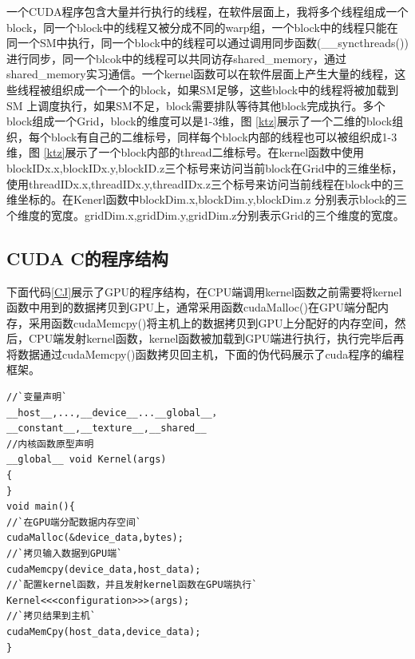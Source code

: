 一个CUDA程序包含大量并行执行的线程，在软件层面上，我将多个线程组成一个block，同一个block中的线程又被分成不同的warp组，一个block中的线程只能在同一个SM中执行，同一个block中的线程可以通过调用同步函数(\_\_syncthreads())进行同步，同一个blcok中的线程可以共同访存shared\_memory，通过shared\_memory实习通信。一个kernel函数可以在软件层面上产生大量的线程，这些线程被组织成一个一个的block，如果SM足够，这些block中的线程将被加载到SM 上调度执行，如果SM不足，block需要排队等待其他block完成执行。多个block组成一个Grid，block的维度可以是1-3维，图 \ref{ktz}展示了一个二维的block组织，每个block有自己的二维标号，同样每个block内部的线程也可以被组织成1-3维，图 \ref{ktz}展示了一个block内部的thread二维标号。在kernel函数中使用blockIDx.x,blockIDx.y,blockID.z三个标号来访问当前block在Grid中的三维坐标，使用threadIDx.x,threadIDx.y,threadIDx.z三个标号来访问当前线程在block中的三维坐标的。在Kenerl函数中blockDim.x,blockDim.y,blockDim.z 分别表示block的三个维度的宽度。gridDim.x,gridDim.y,gridDim.z分别表示Grid的三个维度的宽度。

\subsection{CUDA C的程序结构}

下面代码\ref{CJ}展示了GPU的程序结构，在CPU端调用kernel函数之前需要将kernel函数中用到的数据拷贝到GPU上，通常采用函数cudaMalloc()在GPU端分配内存，采用函数cudaMemcpy()将主机上的数据拷贝到GPU上分配好的内存空间，然后，CPU端发射kernel函数，kernel函数被加载到GPU端进行执行，执行完毕后再将数据通过cudaMemcpy()函数拷贝回主机，下面的伪代码展示了cuda程序的编程框架。
\begin{lstlisting}[caption={CUDA程序结构},captionpos=b,firstnumber=1,label={CJ}]
//`变量声明`
__host__,...,__device__...__global__，
__constant__,__texture__,__shared__
//内核函数原型声明
__global__ void Kernel(args)
{
}
void main(){
//`在GPU端分配数据内存空间`
cudaMalloc(&device_data,bytes);
//`拷贝输入数据到GPU端`
cudaMemcpy(device_data,host_data);
//`配置kernel函数，并且发射kernel函数在GPU端执行`
Kernel<<<configuration>>>(args);
//`拷贝结果到主机`
cudaMemCpy(host_data,device_data);
}
\end{lstlisting}
